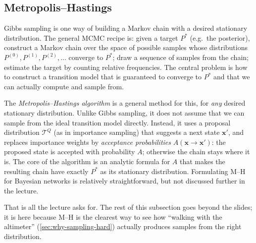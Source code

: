 \documentclass[11pt, oneside]{book}
\newcommand{\bx}{\mathbf{x}}  \newcommand{\by}{\mathbf{y}}
\let\originalsubsection\subsection
\renewcommand{\subsection}{\Needspace{6\baselineskip}\originalsubsection}
\begin{document}
\subsection{Metropolis--Hastings}
\label{sec:mh}

Gibbs sampling is one way of building a Markov chain with a desired
stationary distribution. The general MCMC recipe is: given a target $P^*$
(e.g.\ the posterior), construct a Markov chain over the space of possible
samples whose distributions $P^{(0)}, P^{(1)}, P^{(2)}, \ldots$ converge to
$P^*$; draw a sequence of samples from the chain; estimate the target by
counting relative frequencies. The central problem is how to construct a
transition model that is guaranteed to converge to $P^*$ and that we can
actually compute and sample from.

The \emph{Metropolis--Hastings algorithm} is a general method for this, for
\emph{any} desired stationary distribution. Unlike Gibbs sampling, it does not
assume that we can sample from the ideal transition model directly. Instead,
it uses a proposal distribution $\mathcal{T}^Q$ (as in importance sampling)
that suggests a next state $\bx'$, and replaces importance weights by
\emph{acceptance probabilities} $A(\bx \to \bx')$: the proposed state is
accepted with probability $A$; otherwise the chain stays where it is. The
core of the algorithm is an analytic formula for $A$ that makes the resulting
chain have exactly $P^*$ as its stationary distribution. Formulating M--H for
Bayesian networks is relatively straightforward, but not discussed further in
the lecture.

That is all the lecture asks for. The rest of this subsection goes beyond the
slides; it is here because M--H is the clearest way to see how ``walking with
the altimeter'' (\cref{sec:why-sampling-hard}) actually produces samples
from the right distribution.
\end{document}
